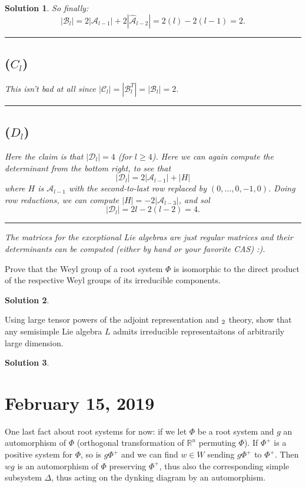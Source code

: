 \documentclass[12pt]{article}
\newenvironment{hwprob}[1]
{\renewcommand{\theprob}{#1}%
 \addtocounter{thm}{-1}%
 \begin{prob}}
{\end{prob}}
\theoremstyle{nonumberbreak}
\newtheorem{sol}{Solution}
\theoremstyle{changebreak}
\theoremstyle{nonumberbreak}
\theoremstyle{change}
\newcommand*{\R}{
\mathbb{R}
}
\newcommand*{\brk}{
\rule{2in}{.1pt}
}
\let\sl\relax
\DeclareMathOperator{\sl}{\mathfrak{sl}}
\begin{document}
\begin{sol}
	So finally:
	\[|\mathcal B_l|=2|\mathcal A_{l-1}|+2|\hat{\mathcal A}_{l-2}|=2(l)-2(l-1)=2.\]

	\brk
	\subsection*{($C_l$)}
	This isn't bad at all since $|\mathcal C_l|=|\mathcal B_l^T|=|\mathcal B_l|=2$.

	\brk
	\subsection*{($D_l$)}
	Here the claim is that $|\mathcal D_l|=4$ (for $l\ge 4$). Here we can again compute the determinant from the 
	bottom right, to see that 
	\[|\mathcal D_l|=2|\mathcal A_{l-1}|+|H|\]
	where $H$ is $\mathcal A_{l-1}$ with the second-to-last row replaced by $(0,\dots,0,-1,0)$.
	Doing row reductions, we can compute $|H|=-2|\mathcal A_{l-3}|$, and sol
	\[|\mathcal D_l|=2l-2(l-2)=4.\]

	\brk

	The matrices for the exceptional Lie algebras are just regular matrices and their determinants can 
	be computed (either by hand or your favorite CAS) :).
\end{sol}

\begin{hwprob}{13.4}
	Prove that the Weyl group of a root system $\Phi$ is isomorphic to the direct product of the
	respective Weyl groups of its irreducible components.
\end{hwprob}
\begin{sol}

\end{sol}

\begin{hwprob}{(Board)}
	Using large tensor powers of the adjoint representation and $\sl_2$ theory, show that any semisimple Lie algebra $L$ admits irreducible representaitons of arbitrarily large dimension.
\end{hwprob}
\begin{sol}

\end{sol}
\newpage

\section{February 15, 2019}
One last fact about root systems for now:  if we let $\Phi$ be a root system and $g$ an automorphism of $\Phi$
(orthogonal transformation of $\R^n$ permuting $\Phi$). If $\Phi^+$ is a positive system for $\Phi$, so is $g\Phi^+$ 
and we can find $w\in W$ sending $g\Phi^+$ to $\Phi^+$. Then $wg$ is an automorphism of $\Phi$ preserving $\Phi^+$,
thus also the corresponding simple subsystem $\Delta$, thus acting on the dynking diagram by an automorphism.
\end{document}
